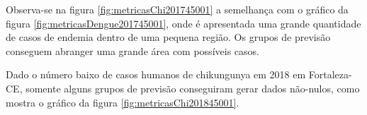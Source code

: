 Observa-se na figura \ref{fig:metricasChi201745001} a semelhança com o gráfico da figura \ref{fig:metricasDengue201745001}, onde é apresentada uma grande quantidade de casos de endemia dentro de uma pequena região. Os grupos de previsão conseguem abranger uma grande área com possíveis casos.
\begin{figure}[!ht]
	\centering	
\end{figure}
\FloatBarrier

Dado o número baixo de casos humanos de chikungunya em 2018 em Fortaleza-CE, somente alguns grupos de previsão conseguiram gerar dados não-nulos, como mostra o gráfico da figura \ref{fig:metricasChi201845001}.
\begin{figure}[!ht]
	\centering	
\end{figure}
\FloatBarrier

